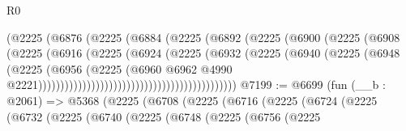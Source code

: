 \begin{lexlean}{R0}
\begin{coremodule}
                                              (@2225
                                                (@6876
                                                  (@2225
                                                    (@6884
                                                      (@2225
                                                        (@6892
                                                          (@2225
                                                            (@6900
                                                              (@2225
                                                                (@6908
                                                                  (@2225
                                                                    (@6916
                                                                      (@2225
                                                                        (@6924
                                                                          (@2225
                                                                            (@6932
                                                                              (@2225
                                                                                (@6940
                                                                                  (@2225
                                                                                    (@6948
                                                                                      (@2225
                                                                                        (@6956
                                                                                          (@2225
                                                                                            (@6960
                                                                                              @6962
                                                                                              @4990
                                                                                              @2221)))))))))))))))))))))))))))))))))))))))))))))
@7199 := @6699
    (fun (__b : @2061) =>
    @5368
      (@2225
        (@6708
          (@2225
            (@6716
              (@2225
                (@6724
                  (@2225
                    (@6732
                      (@2225
                        (@6740
                          (@2225
                            (@6748
                              (@2225
                                (@6756
                                  (@2225

\end{coremodule}
\end{lexlean}
